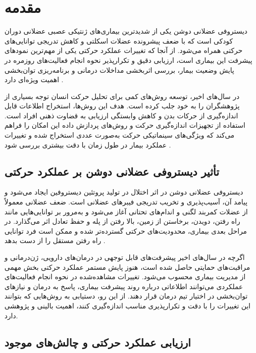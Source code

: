 \section{مقدمه}

دیستروفی عضلانی دوشن یکی از شدیدترین بیماری‌های ژنتیکی عصبی عضلانی دوران کودکی است که با ضعف پیشرونده عضلات اسکلتی و کاهش تدریجی توانایی‌های حرکتی همراه می‌شود. از آنجا که تغییرات عملکرد حرکتی یکی از مهم‌ترین نمودهای پیشرفت این بیماری است، ارزیابی دقیق و تکرارپذیر نحوه انجام فعالیت‌های روزمره در پایش وضعیت بیمار، بررسی اثربخشی مداخلات درمانی و برنامه‌ریزی توان‌بخشی اهمیت ویژه‌ای دارد 
\cite{Bushby2010Diagnosis,Bushby2010ManagementPart2}.

در سال‌های اخیر، توسعه روش‌های کمی برای تحلیل حرکت انسان توجه بسیاری از پژوهشگران را به خود جلب کرده است. هدف این روش‌ها، استخراج اطلاعات قابل اندازه‌گیری از حرکات بدن و کاهش وابستگی ارزیابی به قضاوت ذهنی افراد است. استفاده از تجهیزات اندازه‌گیری حرکت و روش‌های پردازش داده این امکان را فراهم می‌کند که ویژگی‌های سینماتیکی حرکت به‌صورت عددی استخراج شده و تغییرات عملکرد بیمار در طول زمان با دقت بیشتری بررسی شود \cite{Winter2009Biomechanics}.

\subsection{تأثیر دیستروفی عضلانی دوشن بر عملکرد حرکتی}

دیستروفی عضلانی دوشن در اثر اختلال در تولید پروتئین دیستروفین ایجاد می‌شود و پیامد آن، آسیب‌پذیری و تخریب تدریجی فیبرهای عضلانی است. ضعف عضلانی معمولاً از عضلات کمربند لگنی و اندام‌های تحتانی آغاز می‌شود و به‌مرور بر توانایی‌هایی مانند راه رفتن، دویدن، برخاستن از زمین، بالا رفتن از پله و حفظ تعادل اثر می‌گذارد. در مراحل بعدی بیماری، محدودیت‌های حرکتی گسترده‌تر شده و ممکن است فرد توانایی راه رفتن مستقل را از دست بدهد \cite{Bushby2010Diagnosis}.

اگرچه در سال‌های اخیر پیشرفت‌های قابل توجهی در درمان‌های دارویی، ژن‌درمانی و مراقبت‌های حمایتی حاصل شده است، هنوز پایش مستمر عملکرد حرکتی بخش مهمی از مدیریت بیماری محسوب می‌شود. تغییرات مشاهده‌شده در نحوه انجام فعالیت‌های عملکردی می‌توانند اطلاعاتی درباره روند پیشرفت بیماری، پاسخ به درمان و نیازهای توان‌بخشی در اختیار تیم درمان قرار دهند. از این رو، دستیابی به روش‌هایی که بتوانند این تغییرات را با دقت و تکرارپذیری مناسب اندازه‌گیری کنند، اهمیت بالینی و پژوهشی دارد.

\subsection{ارزیابی عملکرد حرکتی و چالش‌های موجود}

